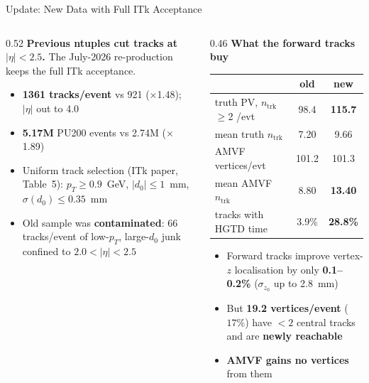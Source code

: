 \documentclass[xcolor=table,aspectratio=169]{beamer}
\newcommand{\ntrk}{\ensuremath{n_\mathrm{trk}}}
\begin{document}
\begin{frame}{Update: New Data with Full ITk Acceptance}
    \begin{columns}[T]
        \begin{column}{0.52\linewidth}
            \textbf{Previous ntuples cut tracks at $|\eta|<2.5$.} The July-2026
            re-production keeps the full ITk acceptance.
            \vspace{0.4em}
            \begin{itemize}\setlength\itemsep{0.25em}
                \item \textbf{1361 tracks/event} vs 921 ($\times$1.48); $|\eta|$ out to 4.0
                \item \textbf{5.17M} PU200 events vs 2.74M ($\times$1.89)
                \item Uniform track selection (ITk paper, Table~5):
                      $p_T\!\ge\!0.9$~GeV, $|d_0|\!\le\!1$~mm, $\sigma(d_0)\!\le\!0.35$~mm
                \item Old sample was \textbf{contaminated}: 66 tracks/event of
                      low-$p_T$, large-$d_0$ junk confined to $2.0<|\eta|<2.5$
            \end{itemize}
        \end{column}
        \begin{column}{0.46\linewidth}
            \centering
            \textbf{What the forward tracks buy}
            \vspace{0.3em}
            {\footnotesize
            \begin{tabular}{lcc}
                \hline
                 & old & new \\
                \hline
                truth PV, \ntrk$\ge$2 /evt & 98.4 & \textbf{115.7} \\
                mean truth \ntrk & 7.20 & 9.66 \\
                AMVF vertices/evt & 101.2 & 101.3 \\
                mean AMVF \ntrk & 8.80 & \textbf{13.40} \\
                tracks with HGTD time & 3.9\% & \textbf{28.8\%} \\
                \hline
            \end{tabular}}
            \vspace{0.5em}
            \begin{itemize}\footnotesize\setlength\itemsep{0.2em}
                \item Forward tracks improve vertex-$z$ localisation by only
                      \textbf{0.1--0.2\%} ($\sigma_{z_0}$ up to 2.8~mm)
                \item But \textbf{19.2 vertices/event} ($17\%$) have $<2$ central
                      tracks and are \textbf{newly reachable}
                \item \textbf{AMVF gains no vertices} from them
            \end{itemize}
        \end{column}
    \end{columns}
\end{frame}
\end{document}
